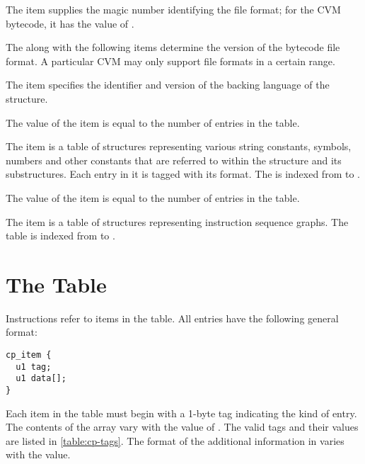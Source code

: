 \begin{description}[font=\ttfamily\mdseries,style=nextline]
  \item[magic]
  The  item supplies the magic number identifying the  file format; for the CVM bytecode, it has the value of . 
  \item[major\_version, minor\_version]
  The  along with the following  items determine the version of the bytecode file format. A particular CVM may only support file formats in a certain range. 
  \item[dialect]
  The  item specifies the identifier and version of the backing language of the  structure. 
  \item[constant\_pool\_count]
  The value of the  item is equal to the number of entries in the  table. 
  \item[constant\_pool]
  The  item is a table of structures representing various string constants, symbols, numbers and other constants that are referred to within the  structure and its substructures. Each entry in it is tagged with its format. The  is indexed from  to . 
  \item[graphs\_count]
  The value of the  item is equal to the number of entries in the  table. 
  \item[graphs]
  The  item is a table of structures representing instruction sequence graphs. The  table is indexed from  to . 
\end{description}





\section{The  Table}

Instructions refer to items in the  table. All entries have the following general format:
\begin{lstlisting}
cp_item {
  u1 tag;
  u1 data[];
}
\end{lstlisting}

Each item in the  table must begin with a 1-byte tag indicating the kind of  entry. The contents of the  array vary with the value of . The valid tags and their values are listed in \autoref{table:cp-tags}. The format of the additional information in  varies with the  value. 

